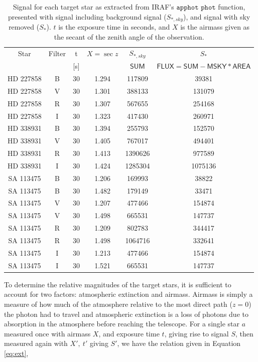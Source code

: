 \documentclass{article}
\begin{document}
\begin{table}
\begin{center}
\begin{tabular}{c | c | c | c | c | c }
Star & Filter & t & $X=\sec{z}$ & $S_{*,sky}$ & $S_*$\\
 &  & [s]&  & $\mathsf{SUM}$ & $\mathsf{FLUX=SUM-MSKY*AREA}$\\
\hline
HD 227858 & B & 30 & 1.294 & 117809 & 39381 \\
HD 227858 & V & 30 & 1.301 & 388133 & 131079  \\
HD 227858 & R & 30 & 1.307 & 567655 & 254168  \\
HD 227858 & I &  30 & 1.323 & 417430 & 260971   \\
HD 338931 & B & 30 & 1.394 & 255793 & 152570 \\
HD 338931 & V & 30 & 1.405 & 767017 & 494401  \\
HD 338931 & R & 30 & 1.413 & 1390626 &  977589 \\
HD 338931 & I & 30 &  1.424 & 1285304 &  1075136 \\
SA 113475 & B & 30 & 1.206  & 169993 & 38822  \\
SA 113475 & B & 30 & 1.482  & 179149 &  33471 \\
SA 113475 & V & 30 & 1.207  & 477466 & 154874 \\
SA 113475 & V & 30 & 1.498  & 665531 &  147737 \\
SA 113475 & R & 30 & 1.209 & 802783  & 344417  \\
SA 113475 & R & 30 & 1.498 & 1064716 & 332641 \\
SA 113475 & I & 30 & 1.213 & 477466  & 154874  \\
SA 113475 & I & 30 & 1.521& 665531 & 147737   \\
\end{tabular}
\caption{Signal for each target star as extracted from IRAF's ${\texttt{apphot phot}}$ function, presented with
signal including background signal ($S_{*,sky}$), and signal with sky removed ($S_*$). $t$ is the exposure time in seconds,
and $X$ is the airmass given as the secant of the zenith angle of the observation.}
\label{table:Counts} 
\end{center}
\end{table}

To determine the relative magnitudes of the target stars, it is sufficient to account for two factors: atmospheric extinction
and airmass. Airmass is simply a measure of how much of the atmosphere relative to the most direct path ($z=0$) the photon
had to travel and atmospheric extinction is a loss of photons due to absorption in the atmosphere before reaching the telescope.
For a single star $a$ measured once with airmass $X$, and exposure time $t$, giving rise to signal $S$, then measured again
with $X',~t'$ giving $S'$, we have the relation given in Equation \ref{eq:ext},
\end{document}
